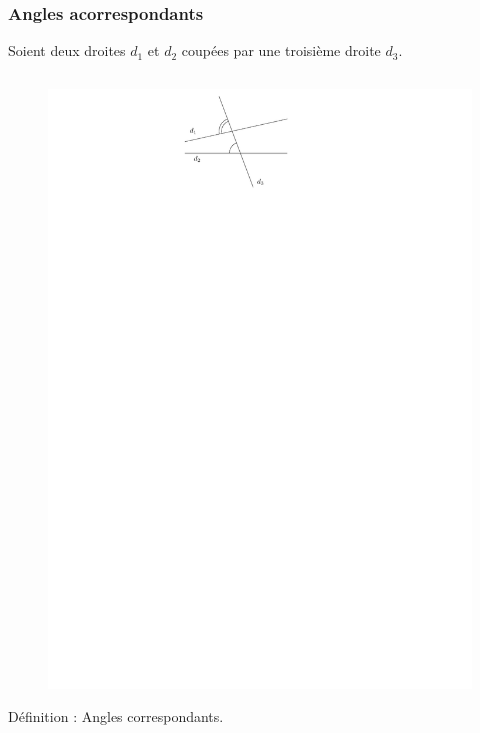 \documentclass{beamer}
\begin{document}
\begin{frame}
  \frametitle{Angles acorrespondants}
  Soient deux droites $d_1$ et $d_2$ coupées par une troisième droite $d_3$.
  \begin{columns}[t]
    \begin{column}{5cm}
      \begin{figure}[H]
        \centering
        \includegraphics[width=0.6\linewidth]{5x10-angles/sources/corres-1.pdf}
      \end{figure}
      \begin{block}{Définition :}	
        Angles correspondants.
      \end{block}   


\end{column}
\end{columns}
\end{frame}
\end{document}
